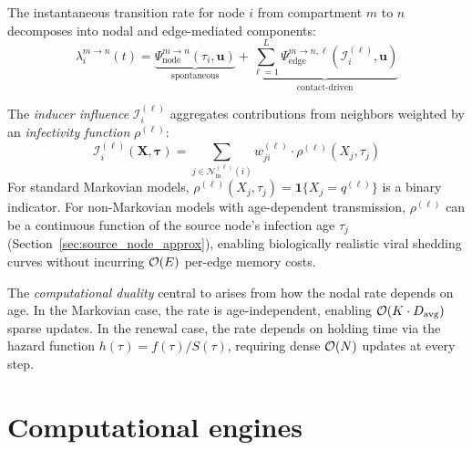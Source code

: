 The instantaneous transition rate for node $i$ from compartment $m$ to $n$ decomposes into nodal and edge-mediated components:
\begin{equation}
    \lambda_{i}^{m \to n}(t) = \underbrace{\Psi_{\text{node}}^{m \to n}(\tau_i, \mathbf{u})}_{\text{spontaneous}} + \underbrace{\sum_{\ell=1}^{L} \Psi_{\text{edge}}^{m \to n, \ell}\left(\mathcal{I}_i^{(\ell)}, \mathbf{u}\right)}_{\text{contact-driven}}
    \label{eq:general_rate}
\end{equation}

The \emph{inducer influence} $\mathcal{I}_i^{(\ell)}$ aggregates contributions from neighbors weighted by an \emph{infectivity function} $\rho^{(\ell)}$:
\begin{equation}
    \mathcal{I}_i^{(\ell)}(\mathbf{X}, \bm{\tau}) = \sum_{j \in \mathcal{N}_{\text{in}}^{(\ell)}(i)} w_{ji}^{(\ell)} \cdot \rho^{(\ell)}(X_j, \tau_j)
    \label{eq:influence}
\end{equation}
For standard Markovian models, $\rho^{(\ell)}(X_j, \tau_j) = \mathbf{1}\{X_j = q^{(\ell)}\}$ is a binary indicator. For non-Markovian models with age-dependent transmission, $\rho^{(\ell)}$ can be a continuous function of the source node's infection age $\tau_j$ (Section~\ref{sec:source_node_approx}), enabling biologically realistic viral shedding curves without incurring $\mathcal{O}(E)$ per-edge memory costs.

The \emph{computational duality} central to \flashspread{} arises from how the nodal rate depends on age. In the Markovian case, the rate is age-independent, enabling $\mathcal{O}(K \cdot D_{\text{avg}})$ sparse updates. In the renewal case, the rate depends on holding time via the hazard function $h(\tau) = f(\tau)/S(\tau)$, requiring dense $\mathcal{O}(N)$ updates at every step.

\section{Computational engines}\label{sec:engines}

